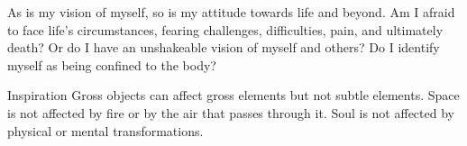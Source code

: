 
\newpage
\begin{mananam}{}
\mananamtext As is my vision of myself, so is my attitude towards life and beyond. Am I afraid to face life’s circumstances, fearing challenges, difficulties, pain, and ultimately death? Or do I have an unshakeable vision of myself and others? Do I identify myself as being confined to the body?
\end{mananam}
\WritingHand{}
\begin{inspiration}{\mananamfont Inspiration}
\mananamtext Gross objects can affect gross elements but not subtle elements. Space is not affected by fire or by the air that passes through it. Soul is not affected by physical or mental transformations.
\end{inspiration}
\newpage


